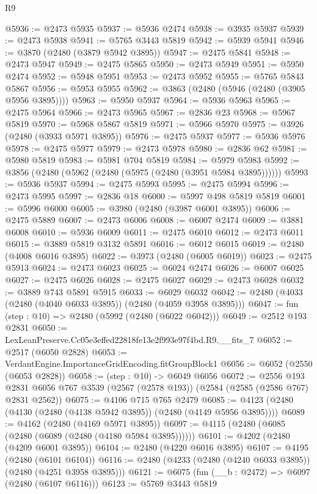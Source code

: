 \begin{lexlean}{R9}
\begin{coremodule}
@5936 := @2473 @5935
@5937 := @5936 @2474
@5938 := @3935 @5937
@5939 := @2473 @5938
@5941 := @5765 @3443 @5819
@5942 := @5939 @5941
@5946 := @3870 (@2480 (@3879 @5942 @3895))
@5947 := @2475 @5841
@5948 := @2473 @5947
@5949 := @2475 @5865
@5950 := @2473 @5949
@5951 := @5950 @2474
@5952 := @5948 @5951
@5953 := @2473 @5952
@5955 := @5765 @5843 @5867
@5956 := @5953 @5955
@5962 := @3863 (@2480 (@5946 (@2480 (@3905 @5956 @3895))))
@5963 := @5950 @5937
@5964 := @5936 @5963
@5965 := @2475 @5964
@5966 := @2473 @5965
@5967 := @2836 @23
@5968 := @5967 @5819
@5970 := @5968 @5867 @5819
@5971 := @5966 @5970
@5975 := @3926 (@2480 (@3933 @5971 @3895))
@5976 := @2475 @5937
@5977 := @5936 @5976
@5978 := @2475 @5977
@5979 := @2473 @5978
@5980 := @2836 @62
@5981 := @5980 @5819
@5983 := @5981 @704 @5819
@5984 := @5979 @5983
@5992 := @3856 (@2480 (@5962 (@2480 (@5975 (@2480 (@3951 @5984 @3895))))))
@5993 := @5936 @5937
@5994 := @2475 @5993
@5995 := @2475 @5994
@5996 := @2473 @5995
@5997 := @2836 @18
@6000 := @5997 @498 @5819 @5819
@6001 := @5996 @6000
@6005 := @3980 (@2480 (@3987 @6001 @3895))
@6006 := @2475 @5889
@6007 := @2473 @6006
@6008 := @6007 @2474
@6009 := @3881 @6008
@6010 := @5936 @6009
@6011 := @2475 @6010
@6012 := @2473 @6011
@6015 := @3889 @5819 @3132 @5891
@6016 := @6012 @6015
@6019 := @2480 (@4008 @6016 @3895)
@6022 := @3973 (@2480 (@6005 @6019))
@6023 := @2475 @5913
@6024 := @2473 @6023
@6025 := @6024 @2474
@6026 := @6007 @6025
@6027 := @2475 @6026
@6028 := @2475 @6027
@6029 := @2473 @6028
@6032 := @3889 @743 @5891 @5915
@6033 := @6029 @6032
@6042 := @2480 (@4033 (@2480 (@4040 @6033 @3895)) (@2480 (@4059 @3958 @3895)))
@6047 := fun (step : @10) => @2480 (@5992 (@2480 (@6022 @6042)))
@6049 := @2512 @193 @2831
@6050 := LexLeanPreserve.Cc05e3effed22818fe13e2f993e97f4bd.R9.__fits_7
@6052 := @2517 (@6050 @2828)
@6053 := VerdantEngine.ImportanceGridEncoding.fitGroupBlock1
@6056 := @6052 (@2550 (@6053 @2828))
@6058 := (step : @10) -> @6049 @6056
@6072 := @2556
    @193
    @2831
    @6056
    @767
    @3539
    (@2567 (@2578 @193))
    (@2584 (@2585 (@2586 @767) @2831 @2562))
@6075 := @4106 @715 @765 @2479
@6085 := @4123 (@2480 (@4130 (@2480 (@4138 @5942 @3895)) (@2480 (@4149 @5956 @3895))))
@6089 := @4162 (@2480 (@4169 @5971 @3895))
@6097 := @4115 (@2480 (@6085 (@2480 (@6089 (@2480 (@4180 @5984 @3895))))))
@6101 := @4202 (@2480 (@4209 @6001 @3895))
@6104 := @2480 (@4220 @6016 @3895)
@6107 := @4195 (@2480 (@6101 @6104))
@6116 := @2480 (@4233 (@2480 (@4240 @6033 @3895)) (@2480 (@4251 @3958 @3895)))
@6121 := @6075 (fun (__b : @2472) => @6097 (@2480 (@6107 @6116)))
@6123 := @5769 @3443 @5819

\end{coremodule}
\end{lexlean}
